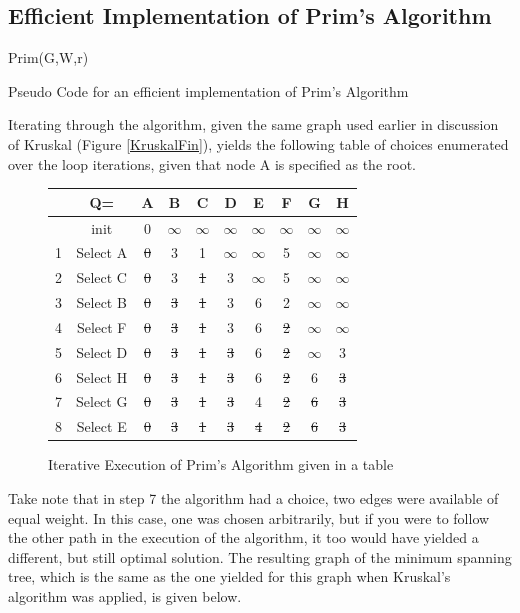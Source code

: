 \documentclass[12pt,letterpaper]{article}
\begin{document}
\subsection{Efficient Implementation of Prim's Algorithm}
\begin{algorithm}[h]
Prim(G,W,r)
\caption{Pseudo Code for an efficient implementation of Prim's Algorithm}
\end{algorithm}
\FloatBarrier
Iterating through the algorithm, given the same graph used earlier in discussion of Kruskal (Figure \ref{KruskalFin}), yields the following table of choices enumerated over the loop iterations, given that node A is specified as the root.
\begin{figure}[h]
\centering
\begin{tabular}{|c|c|c|c|c|c|c|c|c|c|}
\hline
 &Q=&A&B&C&D&E&F&G&H\\ \hline \hline
 &init&0&$\infty$&$\infty$&$\infty$&$\infty$&$\infty$&$\infty$&$\infty$\\ \hline
1&Select A&\st{0}&3&1&$\infty$&$\infty$&5&$\infty$&$\infty$\\ \hline
2&Select C&\st{0}&3&\st{1}&3&$\infty$&5&$\infty$&$\infty$\\ \hline
3&Select B&\st{0}&\st{3}&\st{1}&3&6&2&$\infty$&$\infty$\\ \hline
4&Select F&\st{0}&\st{3}&\st{1}&3&6&\st{2}&$\infty$&$\infty$\\ \hline
5&Select D&\st{0}&\st{3}&\st{1}&\st{3}&6&\st{2}&$\infty$&3\\ \hline
6&Select H&\st{0}&\st{3}&\st{1}&\st{3}&6&\st{2}&6&\st{3}\\ \hline
7&Select G&\st{0}&\st{3}&\st{1}&\st{3}&4&\st{2}&\st{6}&\st{3}\\ \hline
8&Select E&\st{0}&\st{3}&\st{1}&\st{3}&\st{4}&\st{2}&\st{6}&\st{3}\\ \hline
\end{tabular}
\caption{Iterative Execution of Prim's Algorithm given in a table}
\end{figure}
\FloatBarrier
Take note that in step 7 the algorithm had a choice, two edges were available of equal weight. In this case, one was chosen arbitrarily, but if you were to follow the other path in the execution of the algorithm, it too would have yielded a different, but still optimal solution. The resulting graph of the minimum spanning tree, which is the same as the one yielded for this graph when Kruskal's algorithm was applied, is given below. 
\end{document}
